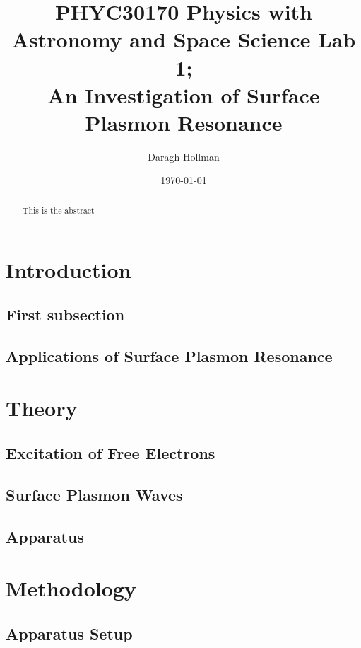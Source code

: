 \documentclass[%
reprint,
amsmath,amssymb,
aps,
]{revtex4-2}
\begin{document}
	
	
	\title{PHYC30170 Physics with Astronomy and Space Science Lab 1;\\An Investigation of Surface Plasmon Resonance}
	
	\author{Daragh Hollman}
	
	\date{\today}
	
	\begin{abstract}
		This is the abstract
	\end{abstract}

	\maketitle
	
	\section{Introduction}
		\subsection{First subsection}
	
		\subsection{Applications of Surface Plasmon Resonance}
	
	\section{Theory}
		\subsection{Excitation of Free Electrons}
		
		\subsection{Surface Plasmon Waves}
		
		\subsection{Apparatus}
		
	 
	\section{Methodology}
		\subsection{Apparatus Setup}
\end{document}

